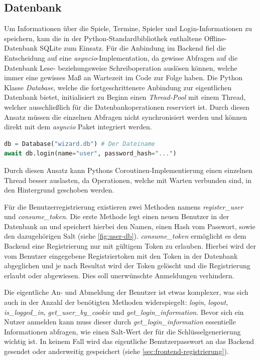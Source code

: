 \subsection{Datenbank}
Um Informationen über die Spiele, Termine, Spieler und Login-Informationen zu speichern, kam die in der Python-Standardbibliothek enthaltene Offline-Datenbank SQLite zum Einsatz. Für die Anbindung im Backend fiel die Entscheidung auf eine \textit{asyncio}-Implementation, da gewisse Abfragen auf die Datenbank Lese- beziehungsweise Schreiboperation auslösen können, welche immer eine gewisses Maß an Wartezeit im Code zur Folge haben. Die Python Klasse \textit{Database}, welche die fortgeschrittenere Anbindung zur eigentlichen Datenbank bietet, initialisiert zu Beginn einen \textit{Thread-Pool} mit einem Thread, welcher ausschließlich für die Datenbankoperationen reserviert ist. Durch diesen Ansatz müssen die einzelnen Abfragen nicht synchronisiert werden und können direkt mit dem \textit{asyncio} Paket integriert werden.

\begin{lstlisting}[language=Python]
db = Database("wizard.db") # Der Dateiname
await db.login(name="user", password_hash="...")
\end{lstlisting}

Durch diesen Ansatz kann Pythons Coroutinen-Implementierung einen einzelnen Thread besser auslasten, da Operationen, welche mit Warten verbunden sind, in den Hintergrund geschoben werden.

Für die Benutzerregistrierung existieren zwei Methoden namens \textit{register\_user} und \textit{consume\_token}. Die erste Methode legt einen neuen Benutzer in der Datenbank an und speichert hierbei den Namen, einen Hash vom Passwort, sowie den dazugehörigen Salt (siehe \cref{fig:user-db}). \textit{consume\_token} ermöglicht es dem Backend eine Registrierung nur mit gültigem Token zu erlauben. Hierbei wird der vom Benutzer eingegebene Registriertoken mit den Token in der Datenbank abgeglichen und je nach Resultat wird der Token gelöscht und die Registrierung erlaubt oder abgewiesen. Dies soll unerwünschte Anmeldungen verhindern.

Die eigentliche An- und Abmeldung der Benutzer ist etwas komplexer, was sich auch in der Anzahl der benötigten Methoden widerspiegelt: \textit{login}, \textit{logout}, \textit{is\_logged\_in}, \textit{get\_user\_by\_cookie} und \textit{get\_login\_information}. Bevor sich ein Nutzer anmelden kann muss dieser durch \textit{get\_login\_information} essentielle Informationen abfragen, wie einen Salt-Wert der für die Schlüsselgenerierung wichtig ist. In keinem Fall wird das eigentliche Benutzerpasswort an das Backend gesendet oder anderweitig gespeichert (siehe \cref{sec:frontend-registrierung}).

